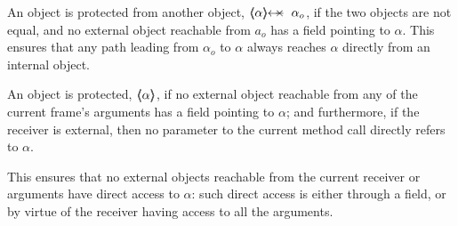  An object is protected from another object, $\protectedFrom{{\alpha}} {{\alpha_{o}}}$, if 
the two objects are not equal, and no external object reachable from $a_o$ has a field pointing to  $\alpha$.
This ensures that any path leading from $\alpha_o$ to $\alpha$
always reaches $\alpha$ directly from an internal object.
 

An object is protected,  $\langle\!\!\langle {\alpha} \rangle\!\!\rangle$,  if no external object
reachable from any of the current frame's arguments has a field
pointing to $\alpha$; and furthermore, if the receiver is external,
then
no parameter to the current method call directly refers to $\alpha$.

This  ensures that no external objects reachable from the current
receiver or arguments have direct access to $\alpha$: such direct access
is either through a field, or by virtue of the receiver having access to all the arguments.
 


